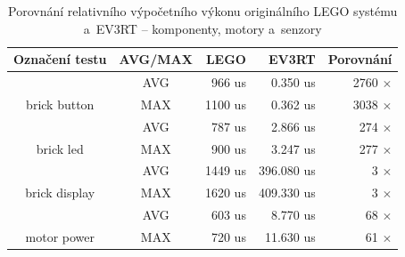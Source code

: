 \begin{table}[]
\centering
\caption{Porovnání relativního výpočetního výkonu originálního LEGO systému a~EV3RT -- \brick{} komponenty, motory a~senzory}
\label{Benchmark-IO}
\begin{tabular}{@{}ccrrr@{}}
\toprule
Označení testu                                       & AVG/MAX                     & LEGO                               & EV3RT                                & Porovnání                                                    \\ \midrule
\multicolumn{1}{|c}{}                                & \cellcolor[HTML]{EFEFEF}AVG & \cellcolor[HTML]{EFEFEF}    966 us & \cellcolor[HTML]{EFEFEF}    0.350 us & \multicolumn{1}{r|}{\cellcolor[HTML]{EFEFEF}   2760 $\times$}  \\
\multicolumn{1}{|c}{\multirow{-2}{*}{brick button}}  & \cellcolor[HTML]{FFFFFF}MAX & \cellcolor[HTML]{FFFFFF}   1100 us & \cellcolor[HTML]{FFFFFF}    0.362 us & \multicolumn{1}{r|}{\cellcolor[HTML]{FFFFFF}   3038 $\times$}  \\ \midrule
\multicolumn{1}{|c}{}                                & \cellcolor[HTML]{EFEFEF}AVG & \cellcolor[HTML]{EFEFEF}    787 us & \cellcolor[HTML]{EFEFEF}    2.866 us & \multicolumn{1}{r|}{\cellcolor[HTML]{EFEFEF}    274 $\times$}  \\
\multicolumn{1}{|c}{\multirow{-2}{*}{brick led}}     & \cellcolor[HTML]{FFFFFF}MAX & \cellcolor[HTML]{FFFFFF}    900 us & \cellcolor[HTML]{FFFFFF}    3.247 us & \multicolumn{1}{r|}{\cellcolor[HTML]{FFFFFF}    277 $\times$}  \\ \midrule
\multicolumn{1}{|c}{}                                & \cellcolor[HTML]{EFEFEF}AVG & \cellcolor[HTML]{EFEFEF}   1449 us & \cellcolor[HTML]{EFEFEF}  396.080 us & \multicolumn{1}{r|}{\cellcolor[HTML]{EFEFEF}      3 $\times$}  \\
\multicolumn{1}{|c}{\multirow{-2}{*}{brick display}} & \cellcolor[HTML]{FFFFFF}MAX & \cellcolor[HTML]{FFFFFF}   1620 us & \cellcolor[HTML]{FFFFFF}  409.330 us & \multicolumn{1}{r|}{\cellcolor[HTML]{FFFFFF}      3 $\times$}  \\ \midrule
\multicolumn{1}{|c}{}                                & \cellcolor[HTML]{EFEFEF}AVG & \cellcolor[HTML]{EFEFEF}    603 us & \cellcolor[HTML]{EFEFEF}    8.770 us & \multicolumn{1}{r|}{\cellcolor[HTML]{EFEFEF}     68 $\times$}  \\
\multicolumn{1}{|c}{\multirow{-2}{*}{motor power}}   & \cellcolor[HTML]{FFFFFF}MAX & \cellcolor[HTML]{FFFFFF}    720 us & \cellcolor[HTML]{FFFFFF}   11.630 us & \multicolumn{1}{r|}{\cellcolor[HTML]{FFFFFF}     61 $\times$}  \\ \midrule

\end{tabular}
\end{table}
